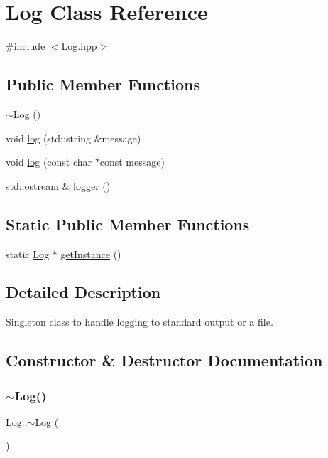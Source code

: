 \hypertarget{classLog}{}\section{Log Class Reference}
\label{classLog}


{\ttfamily \#include $<$Log.\+hpp$>$}

\subsection*{Public Member Functions}
\begin{DoxyCompactItemize}
\item 
\hyperlink{classLog_a0fbfda88fbee5027c89f6eb121059360}{$\sim$\+Log} ()
\item 
void \hyperlink{classLog_ac4365b77dc0b64c77e577888dfab5099}{log} (std\+::string \&message)
\item 
void \hyperlink{classLog_a60929e600b7759e97ea623ea5b05971e}{log} (const char $\ast$const message)
\item 
std\+::ostream \& \hyperlink{classLog_a32d048a4924c7851c4b7b16758675af6}{logger} ()
\end{DoxyCompactItemize}
\subsection*{Static Public Member Functions}
\begin{DoxyCompactItemize}
\item 
static \hyperlink{classLog}{Log} $\ast$ \hyperlink{classLog_a987f3ff401eea783d0e80daaea1d7aca}{get\+Instance} ()
\end{DoxyCompactItemize}


\subsection{Detailed Description}
Singleton class to handle logging to standard output or a file. 

\subsection{Constructor \& Destructor Documentation}
\hypertarget{classLog_a0fbfda88fbee5027c89f6eb121059360}{}\label{classLog_a0fbfda88fbee5027c89f6eb121059360} 
\subsubsection{\texorpdfstring{$\sim$\+Log()}{~Log()}}
{\ttfamily Log\+::$\sim$\+Log (\begin{DoxyParamCaption}{ }\end{DoxyParamCaption})}

